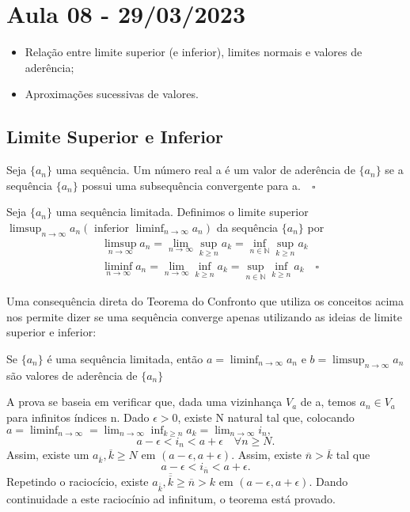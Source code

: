 \documentclass[Analysis/analysis_notes.tex]{subfiles}
\begin{document}
\section{Aula 08 - 29/03/2023}
\begin{itemize}
	\item Rela\c c\~ao entre limite superior (e inferior), limites normais e valores de ader\^encia;
	\item Aproxima\c c\~oes sucessivas de valores.
\end{itemize}
\subsection{Limite Superior e Inferior}
\begin{def*}
	Seja $\{a_{n}\} $ uma sequ\^encia. Um n\'umero real a \'e um valor de ader\^encia de $\{a_{n}\} $ se a sequ\^encia $\{a_{n}\}$ possui
	uma subsequ\^encia convergente para a.$\quad\square$
\end{def*}
\begin{def*}
	Seja $\{a_{n}\} $  uma sequ\^encia limitada. Definimos o limite superior $\displaystyle\limsup_{n\to\infty}a_{n}(\text{ inferior }\liminf_{n\to\infty}a_{n})$ da
	sequ\^encia $\{a_{n}\} $ por
	\begin{align*}
		 & \limsup_{n\to\infty}a_{n} = \lim_{n\to\infty}\sup_{k\geq{n}}a_{k} = \inf_{n\in \mathbb{N}}\sup_{k\geq{n}}a_{k}             \\
		 & \liminf_{n\to\infty}a_{n} = \lim_{n\to\infty}\inf_{k\geq{n}}a_{k} = \sup_{n\in \mathbb{N}}\inf_{k\geq{n}}a_{k}\quad\square
	\end{align*}
\end{def*}
Uma consequ\^encia direta do Teorema do Confronto que utiliza os conceitos acima nos permite dizer se uma sequ\^encia converge apenas
utilizando as ideias de limite superior e inferior:
\begin{theorem*}
	Se $\{a_{n}\} $ \'e uma sequ\^encia limitada, ent\~ao $a = \liminf_{n\to\infty}a_{n}$ e $b = \limsup_{n\to\infty}a_{n}$
	s\~ao valores de ader\^encia de $\{a_{n}\} $
\end{theorem*}
\begin{proof*}
	A prova se baseia em verificar que, dada uma vizinhan\c ca $V_{a}$ de a, temos $a_{n}\in V_{a}$ para infinitos \'indices n.
	Dado $\epsilon > 0$, existe N natural tal que, colocando $a =\displaystyle \liminf_{n\to\infty} = \lim_{n\to\infty}\inf_{k\geq{n}}a_{k} = \lim_{n\to\infty}i_{n},$
	$$
		a - \epsilon < i_{n} < a + \epsilon \quad \forall n \geq{N}.
	$$
	Assim, existe um $a_{\overline{k}}, \overline{k}\geq{N}$ em $(a-\epsilon, a+\epsilon).$ Assim, existe $\overline{n} > \overline{k}$ tal que
	$$
		a - \epsilon < i_{\overline{n}} < a + \epsilon.
	$$
	Repetindo o racioc\'icio, existe $a_{\overline{\overline{k}}}, \overline{\overline{k}} \geq{\overline{n}} > k$ em $(a - \epsilon, a + \epsilon).$
	Dando continuidade a este racioc\'inio ad infinitum, o teorema est\'a provado. \qedsymbol
\end{proof*}
\end{document}

